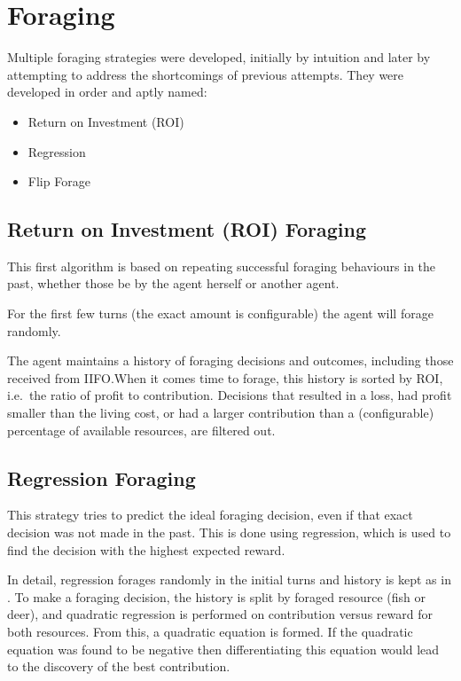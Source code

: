 \section{Foraging}
Multiple foraging strategies were developed, initially by intuition and later by attempting to address the shortcomings of previous attempts. They were developed in order and aptly named:
\begin{itemize}
    \item Return on Investment (ROI)
    \item Regression
    \item Flip Forage
\end{itemize}


\subsection{Return on Investment (ROI) Foraging}%
\label{sec:forage-roi}

This first algorithm is based on repeating successful foraging behaviours in the past, whether those be by the agent herself or another agent.

For the first few turns (the exact amount is configurable) the agent will forage randomly.

The agent maintains a history of foraging decisions and outcomes, including those received from IIFO.\@ When it comes time to forage, this history is sorted by ROI, i.e.\ the ratio of profit to contribution. Decisions that resulted in a loss, had profit smaller than the living cost, or had a larger contribution than a (configurable) percentage of available resources, are filtered out.

\subsection{Regression Foraging}%
\label{sec:forage-regression}

This strategy tries to predict the ideal foraging decision, even if that exact decision was not made in the past. This is done using regression, which is used to find the decision with the highest expected reward.

In detail, regression forages randomly in the initial turns and history is kept as in . To make a foraging decision, the history is split by foraged resource (fish or deer), and quadratic regression is performed on contribution versus reward for both resources. From this, a quadratic equation is formed. If the quadratic equation was found to be negative then differentiating this equation would lead to the discovery of the best contribution.

